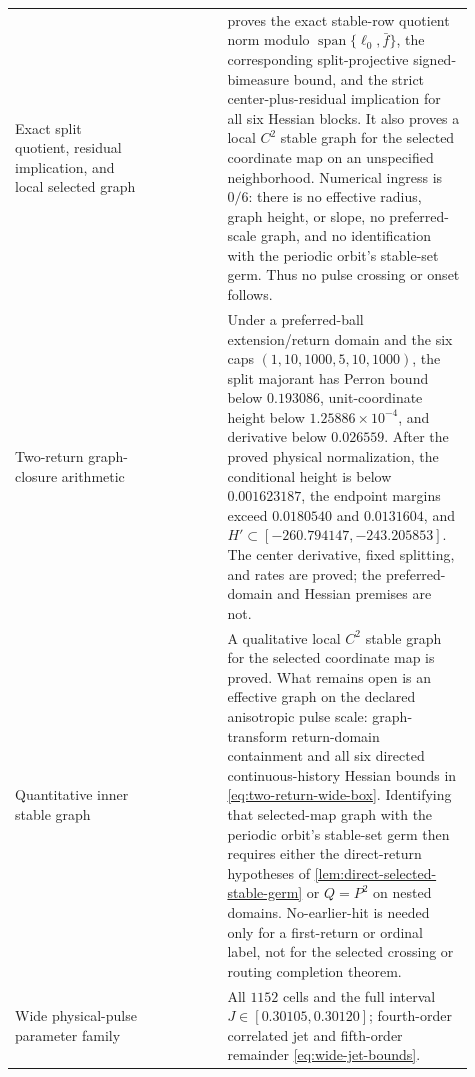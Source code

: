 \begin{longtable}{@{}L{0.28\linewidth}L{0.15\linewidth}L{0.48\linewidth}@{}}
Exact split quotient, residual implication, and local selected graph
& 
&  proves the exact stable-row quotient
  norm modulo \(\operatorname{span}\{\ell_0,\bar f\}\), the corresponding
  split-projective signed-bimeasure bound, and the strict center-plus-residual
  implication for all six Hessian blocks.  It also proves a local \(C^2\)
  stable graph for the selected coordinate map on an unspecified
  neighborhood.  Numerical ingress is \(0/6\): there is no effective radius,
  graph height, or slope, no preferred-scale graph, and no identification
  with the periodic orbit's stable-set germ.  Thus no pulse crossing or onset
  follows.\\

Two-return graph-closure arithmetic
& 
& Under a preferred-ball extension/return domain and the six caps
  \((1,10,1000,5,10,1000)\), the split majorant has Perron bound below
  \(0.193086\), unit-coordinate height below \(1.25886\times10^{-4}\), and
  derivative below \(0.026559\).  After the proved physical normalization,
  the conditional height is below \(0.001623187\), the endpoint margins
  exceed \(0.0180540\) and \(0.0131604\), and
  \(H'\subset[-260.794147,-243.205853]\).  The center derivative, fixed
  splitting, and rates are proved; the preferred-domain and Hessian premises
  are not.\\

Quantitative inner stable graph
& 
& A qualitative local \(C^2\) stable graph for the selected coordinate map is
  proved.  What remains open is an effective graph on the declared
  anisotropic pulse scale: graph-transform return-domain containment and all
  six directed continuous-history Hessian bounds in
  \cref{eq:two-return-wide-box}.  Identifying that selected-map graph with
  the periodic orbit's stable-set germ then requires either the direct-return
  hypotheses of \cref{lem:direct-selected-stable-germ} or \(Q=P^2\) on nested
  domains.  No-earlier-hit is needed only for a first-return or ordinal label,
  not for the selected crossing or routing completion theorem.\\

Wide physical-pulse parameter family
& 
& All \(1152\) cells and the full interval
  \(J\in[0.30105,0.30120]\); fourth-order correlated jet and fifth-order
  remainder \cref{eq:wide-jet-bounds}.\\


\end{longtable}
